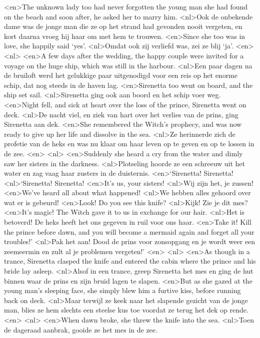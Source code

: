 <en>The unknown lady too had never forgotten the young man she had found on the beach and soon after, he asked her to marry him.
<nl>Ook de onbekende dame was de jonge man die ze op het strand had gevonden nooit vergeten, en kort daarna vroeg hij haar om met hem te trouwen.
<en>Since she too was in love, she happily said `yes'.
<nl>Omdat ook zij verliefd was, zei ze blij `ja'.
<en>
<nl>
<en>A few days after the wedding, the happy couple were invited for a voyage on the huge ship, which was still in the harbour.
<nl>Een paar dagen na de bruiloft werd het gelukkige paar uitgenodigd voor een reis op het enorme schip, dat nog steeds in de haven lag.
<en>Sirenetta too went on board, and the ship set sail.
<nl>Sirenetta ging ook aan boord en het schip voer weg.
<en>Night fell, and sick at heart over the loss of the prince, Sirenetta went on deck.
<nl>De nacht viel, en ziek van hart over het verlies van de prins, ging Sirenetta aan dek.
<en>She remembered the Witch’s prophecy, and was now ready to give up her life and dissolve in the sea.
<nl>Ze herinnerde zich de profetie van de heks en was nu klaar om haar leven op te geven en op te lossen in de zee.
<en>
<nl>
<en>Suddenly she heard a cry from the water and dimly saw her sisters in the darkness.
<nl>Plotseling hoorde ze een schreeuw uit het water en zag vaag  haar zusters  in de duisternis.
<en>`Sirenetta! Sirenetta!
<nl>`Sirenetta! Sirenetta!
<en>It’s us, your sisters!
<nl>Wij zijn het, je zussen!
<en>We’ve heard all about what happened!
<nl>We hebben alles gehoord over wat er is gebeurd!
<en>Look! Do you see this knife?
<nl>Kijk! Zie je dit mes?
<en>It’s magic! The Witch gave it to us in exchange for our hair.
<nl>Het is betoverd! De heks heeft het ons gegeven in ruil voor ons haar.
<en>Take it! Kill the prince before dawn, and you will become a mermaid again and forget all your troubles!'
<nl>Pak het aan! Dood de prins voor zonsopgang en je wordt weer een zeemeermin en zult  al je problemen vergeten!'
<en>
<nl>
<en>As though in a trance, Sirenetta clasped the knife and entered the cabin where the prince and his bride lay asleep.
<nl>Alsof in een trance, greep Sirenetta het mes en ging de hut binnen waar de prins en zijn bruid lagen te slapen.
<en>But as she gazed at the young man’s sleeping face, she simply blew him a furtive kiss, before running back on deck.
<nl>Maar terwijl ze keek naar het slapende gezicht van de jonge man, blies ze hem slechts  een steelse kus toe voordat ze terug het  dek op rende.
<en>
<nl>
<en>When dawn broke, she threw the knife into the sea.
<nl>Toen de dageraad aanbrak, gooide ze het mes in de zee.
